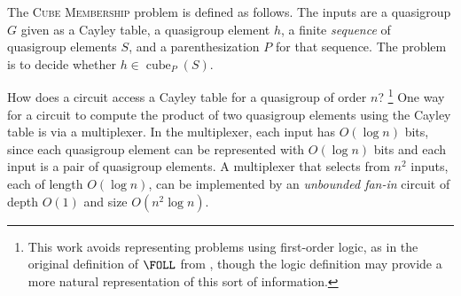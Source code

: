 \documentclass{article}
\newcommand{\gen}[1]{\langle #1 \rangle}
\DeclareMathOperator{\cube}{cube}
\DeclareMathOperator{\Path}{Path}
\begin{document}


The \textsc{Cube Membership} problem is defined as follows.
The inputs are a quasigroup $G$ given as a Cayley table, a quasigroup element $h$, a finite \emph{sequence} of quasigroup elements $S$, and a parenthesization $P$ for that sequence.
The problem is to decide whether $h \in \cube_P(S)$.

How does a circuit access a Cayley table for a quasigroup of order $n$?%
\footnote{This work avoids representing problems using first-order logic, as in the original definition of $\FOLL$ from \autocite{bklm01}, though the logic definition may provide a more natural representation of this sort of information.}
One way for a circuit to compute the product of two quasigroup elements using the Cayley table is via a multiplexer.
In the multiplexer, each input has $O(\log n)$ bits, since each quasigroup element can be represented with $O(\log n)$ bits and each input is a pair of quasigroup elements.
A multiplexer that selects from $n^2$ inputs, each of length $O(\log n)$, can be implemented by an \emph{unbounded fan-in} circuit of depth $O(1)$ and size $O(n^2 \log n)$.
\end{document}
